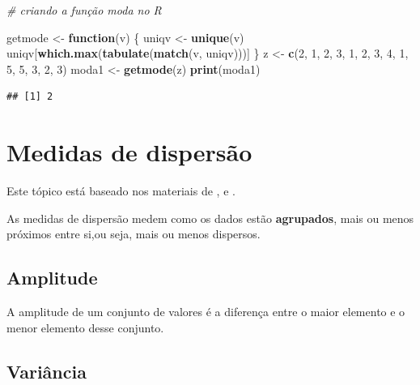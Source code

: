 \documentclass[
]{book}
\newenvironment{Shaded}{\begin{snugshade}}{\end{snugshade}}
\newcommand{\CommentTok}[1]{\textcolor[rgb]{0.56,0.35,0.01}{\textit{#1}}}
\newcommand{\ControlFlowTok}[1]{\textcolor[rgb]{0.13,0.29,0.53}{\textbf{#1}}}
\newcommand{\DecValTok}[1]{\textcolor[rgb]{0.00,0.00,0.81}{#1}}
\newcommand{\KeywordTok}[1]{\textcolor[rgb]{0.13,0.29,0.53}{\textbf{#1}}}
\newcommand{\NormalTok}[1]{#1}
\newcommand{\StringTok}[1]{\textcolor[rgb]{0.31,0.60,0.02}{#1}}
\begin{document}
\begin{Shaded}
\begin{Highlighting}[]
\CommentTok{# criando a função moda no R}

\NormalTok{getmode <-}\StringTok{ }\ControlFlowTok{function}\NormalTok{(v) \{}
\NormalTok{    uniqv <-}\StringTok{ }\KeywordTok{unique}\NormalTok{(v)}
\NormalTok{    uniqv[}\KeywordTok{which.max}\NormalTok{(}\KeywordTok{tabulate}\NormalTok{(}\KeywordTok{match}\NormalTok{(v, uniqv)))]}
\NormalTok{\}}
\NormalTok{z <-}\StringTok{ }\KeywordTok{c}\NormalTok{(}\DecValTok{2}\NormalTok{, }\DecValTok{1}\NormalTok{, }\DecValTok{2}\NormalTok{, }\DecValTok{3}\NormalTok{, }\DecValTok{1}\NormalTok{, }\DecValTok{2}\NormalTok{, }\DecValTok{3}\NormalTok{, }\DecValTok{4}\NormalTok{, }\DecValTok{1}\NormalTok{, }\DecValTok{5}\NormalTok{, }\DecValTok{5}\NormalTok{, }\DecValTok{3}\NormalTok{, }\DecValTok{2}\NormalTok{, }\DecValTok{3}\NormalTok{)}
\NormalTok{moda1 <-}\StringTok{ }\KeywordTok{getmode}\NormalTok{(z)}
\KeywordTok{print}\NormalTok{(moda1)}
\end{Highlighting}
\end{Shaded}

\begin{verbatim}
## [1] 2
\end{verbatim}

\hypertarget{medidas-de-dispersuxe3o}{%
\section{Medidas de dispersão}\label{medidas-de-dispersuxe3o}}

Este tópico está baseado nos materiais de \citet{Hoffmann2006}, \citet{Morettin2013} e \citet{Sartoris2013}.

As medidas de dispersão medem como os dados estão \textbf{agrupados}, mais ou menos próximos entre si,ou
seja, mais ou menos dispersos.

\hypertarget{amplitude}{%
\subsection{Amplitude}\label{amplitude}}

A amplitude de um conjunto de valores é a diferença entre o maior elemento e o menor elemento desse conjunto.

\hypertarget{variuxe2ncia}{%
\subsection{Variância}\label{variuxe2ncia}}
\end{document}
